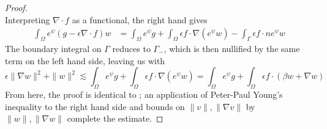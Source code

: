 \documentclass[11pt,onecolumn]{scrartcl}
\newcommand{\grad}{\nabla}
\renewcommand{\div}{\grad \cdot}
\begin{document}
\begin{proof}
\[\]
Interpreting $\div f$ as a functional, the right hand gives
\begin{align*}
\int_\Omega e^\psi (g-\epsilon \div f) w &= \int_\Omega e^\psi g + \int_\Omega \epsilon f \cdot \grad (e^\psi w) - \int_\Gamma \epsilon f\cdot n e^\psi w
\end{align*}
The boundary integral on $\Gamma$ reduces to $\Gamma_-$, which is then nullified by the same term on the left hand side, leaving us with 
\[
\epsilon \|\grad w\|^2 + \|w\|^2 \lesssim \int_\Omega e^\psi g + \int_\Omega \epsilon f \cdot \grad (e^\psi w) = \int_\Omega e^\psi g + \int_\Omega \epsilon f \cdot (\beta w + \grad w)
\]
From here, the proof is identical to \cite{DPGrobustness}; an application of Peter-Paul Young's inequality to the right hand side and bounds on $\|v\|, \|\grad v\|$ by $\|w\|,\|\grad w\|$ complete the estimate.  
\end{proof}
\end{document}
